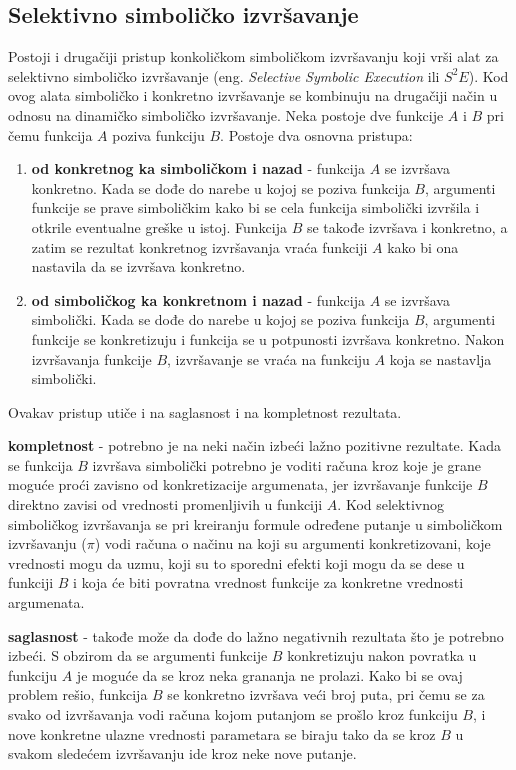 \documentclass[12pt,oneside]{memoir}
\begin{document}
\subsection{Selektivno simboličko izvršavanje}
Postoji i drugačiji pristup konkoličkom simboličkom izvršavanju koji vrši alat za selektivno simboličko izvršavanje (eng. \textit{Selective Symbolic Execution} ili $S^2E$). Kod ovog alata simboličko i konkretno izvršavanje se kombinuju na drugačiji način u odnosu na dinamičko simboličko izvršavanje. Neka postoje dve funkcije $A$ i $B$ pri čemu funkcija $A$ poziva funkciju $B$.
Postoje dva osnovna pristupa:
\begin{enumerate}
    \item \textbf{od konkretnog ka simboličkom i nazad} - funkcija $A$ se izvršava konkretno. Kada se dođe do narebe u kojoj se poziva funkcija $B$, argumenti funkcije se prave simboličkim kako bi se cela funkcija simbolički izvršila i otkrile eventualne greške u istoj. Funkcija $B$ se takođe izvršava i konkretno, a zatim se rezultat konkretnog izvršavanja vraća funkciji $A$ kako bi ona nastavila da se izvršava konkretno.
    
    \item \textbf{od simboličkog ka konkretnom i nazad} - funkcija $A$ se izvršava simbolički. Kada se dođe do narebe u kojoj se poziva funkcija $B$, argumenti funkcije se konkretizuju i funkcija se u potpunosti izvršava konkretno. Nakon izvršavanja funkcije $B$, izvršavanje se vraća na funkciju $A$ koja se nastavlja simbolički.
\end{enumerate}

Ovakav pristup utiče i na saglasnost i na kompletnost rezultata.

\begin{description}
    \item \textbf{kompletnost} - potrebno je na neki način izbeći lažno pozitivne rezultate. Kada se funkcija $B$ izvršava simbolički potrebno je voditi računa kroz koje je grane moguće proći zavisno od konkretizacije argumenata, jer izvršavanje funkcije $B$ direktno zavisi od vrednosti promenljivih u funkciji $A$. Kod selektivnog simboličkog izvršavanja se pri kreiranju formule određene putanje u simboličkom izvršavanju ($\pi$) vodi računa o načinu na koji su argumenti konkretizovani, koje vrednosti mogu da uzmu, koji su to sporedni efekti koji mogu da se dese u funkciji $B$ i koja će biti povratna vrednost funkcije za konkretne vrednosti argumenata.
    
    \item \textbf{saglasnost} - takođe može da dođe do lažno negativnih rezultata što je potrebno izbeći. S obzirom da se argumenti funkcije $B$ konkretizuju nakon povratka u funkciju $A$ je moguće da se kroz neka grananja ne prolazi. Kako bi se ovaj problem rešio, funkcija $B$ se konkretno izvršava veći broj puta, pri čemu se za svako od izvršavanja vodi računa kojom putanjom se prošlo kroz funkciju $B$, i nove konkretne ulazne vrednosti parametara se biraju tako da se kroz $B$ u svakom sledećem izvršavanju ide kroz neke nove putanje.
\end{description} 
\bigskip
\end{document}
